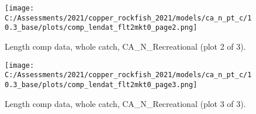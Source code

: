 \documentclass[11pt,
  english,
  a4paper,
]{article}
\begin{document}
\tagmcend\tagstructend


\begin{figure}
\centering
\texttt{[image: C:/Assessments/2021/copper\_rockfish\_2021/models/ca\_n\_pt\_c/10.3\_base/plots/comp\_lendat\_flt2mkt0\_page2.png]}
\caption{Length comp data, whole catch, CA\_N\_Recreational (plot 2 of 3).\label{fig:comp_lendat_flt2mkt0_page2}}
\end{figure}

\tagmcend\tagstructend


\begin{figure}
\centering
\texttt{[image: C:/Assessments/2021/copper\_rockfish\_2021/models/ca\_n\_pt\_c/10.3\_base/plots/comp\_lendat\_flt2mkt0\_page3.png]}
\caption{Length comp data, whole catch, CA\_N\_Recreational (plot 3 of 3).\label{fig:comp_lendat_flt2mkt0_page3}}
\end{figure}

\tagmcend\tagstructend
\end{document}
